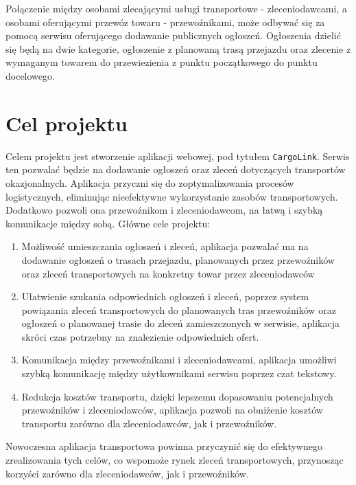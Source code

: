 Połączenie między osobami zlecającymi usługi transportowe - zleceniodawcami, a osobami oferującymi przewóz towaru - przewoźnikami, może odbywać się za pomocą serwisu oferującego dodawanie publicznych ogłoszeń. Ogłoszenia dzielić się będą na dwie kategorie, ogłoszenie z planowaną trasą przejazdu oraz zlecenie z wymaganym towarem do przewiezienia z punktu początkowego do punktu docelowego.

\section{Cel projektu}
\label{sec:cele}
Celem projektu jest stworzenie aplikacji webowej, pod tytułem \texttt{CargoLink}. Serwis ten pozwalać będzie na dodawanie ogłoszeń oraz zleceń dotyczących transportów okazjonalnych. Aplikacja przyczni się do zoptymalizowania procesów logistycznych, eliminując nieefektywne wykorzystanie zasobów transportowych. Dodatkowo pozwoli ona przewoźnikom i zleceniodawcom, na łatwą i szybką komunikacje między sobą.
Główne cele projektu:
\begin{enumerate}
    \item Możliwość umieszczania ogłoszeń i zleceń, aplikacja pozwalać ma na dodawanie ogłoszeń o trasach przejazdu, planowanych przez przewoźników oraz zleceń transportowych na konkretny towar przez zleceniodawców
    \item Ułatwienie szukania odpowiednich ogłoszeń i zleceń, poprzez system powiązania zleceń transportowych do planowanych tras przewoźników oraz ogłoszeń o planowanej trasie do zleceń zamieszczonych w serwisie, aplikacja skróci czas potrzebny na znalezienie odpowiednich ofert.
    \item Komunikacja między przewoźnikami i zleceniodawcami, aplikacja umożliwi szybką komunikację między użytkownikami serwisu poprzez czat tekstowy.
    \item Redukcja kosztów transportu, dzięki lepszemu dopasowaniu potencjalnych przewoźników i zleceniodawców, aplikacja pozwoli na obniżenie kosztów transportu zarówno dla zleceniodawców, jak i przewoźników.
\end{enumerate}
Nowoczesna aplikacja transportowa powinna przyczynić się do efektywnego zrealizowania tych celów, co wspomoże rynek zleceń transportowych, przynosząc korzyści zarówno dla zleceniodawców, jak i przewoźników.

